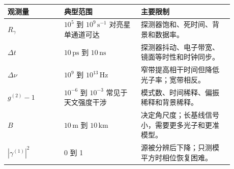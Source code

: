 \begin{longtable}{p{0.22\linewidth}p{0.30\linewidth}p{0.36\linewidth}}
\toprule
观测量 & 典型范围 & 主要限制 \\
\midrule
\(R_\gamma\) & \(10^5\) 到 \(10^9\,\mathrm{s^{-1}}\) 对亮星单通道可达 & 探测器饱和、死时间、背景和数据率。 \\
\(\Delta t\) & \(10\,\mathrm{ps}\) 到 \(10\,\mathrm{ns}\) & 探测器抖动、电子带宽、镜面等时性和时钟同步。 \\
\(\Delta\nu\) & \(10^9\) 到 \(10^{13}\,\mathrm{Hz}\) & 窄带提高相干时间但降低光子率；宽带相反。 \\
\(g^{(2)}-1\) & \(10^{-6}\) 到 \(10^{-3}\) 常见于天文强度干涉 & 模式数、时间稀释、偏振稀释和背景稀释。 \\
\(B\) & \(10\,\mathrm{m}\) 到 \(10\,\mathrm{km}\) & 决定角尺度；长基线信号小，需要更多光子和更准模型。 \\
\(|\gamma^{(1)}|^2\) & 0 到 1 & 源被分辨后下降；只测模平方时相位恢复困难。 \\
\bottomrule
\end{longtable}
